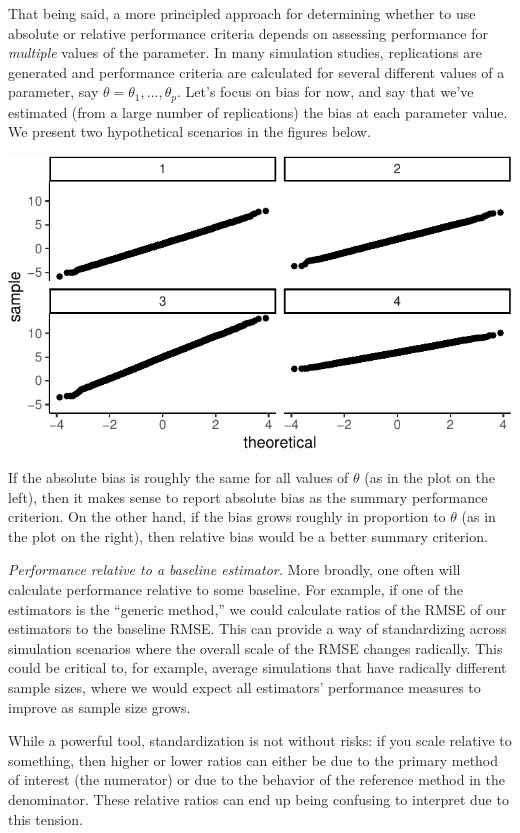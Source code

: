 \documentclass[
]{book}
\begin{document}
That being said, a more principled approach for determining whether to use absolute or relative performance criteria depends on assessing performance for \emph{multiple} values of the parameter.
In many simulation studies, replications are generated and performance criteria are calculated for several different values of a parameter, say \(\theta = \theta_1,...,\theta_p\).
Let's focus on bias for now, and say that we've estimated (from a large number of replications) the bias at each parameter value.
We present two hypothetical scenarios in the figures below.

\begin{center}\includegraphics[width=0.75\linewidth]{Designing-Simulations-in-R_files/figure-latex/unnamed-chunk-72-1} \end{center}

If the absolute bias is roughly the same for all values of \(\theta\) (as in the plot on the left), then it makes sense to report absolute bias as the summary performance criterion.
On the other hand, if the bias grows roughly in proportion to \(\theta\) (as in the plot on the right), then relative bias would be a better summary criterion.

\emph{Performance relative to a baseline estimator.}
More broadly, one often will calculate performance relative to some baseline.
For example, if one of the estimators is the ``generic method,'' we could calculate ratios of the RMSE of our estimators to the baseline RMSE.
This can provide a way of standardizing across simulation scenarios where the overall scale of the RMSE changes radically.
This could be critical to, for example, average simulations that have radically different sample sizes, where we would expect all estimators' performance measures to improve as sample size grows.

While a powerful tool, standardization is not without risks: if you scale relative to something, then higher or lower ratios can either be due to the primary method of interest (the numerator) or due to the behavior of the reference method in the denominator.
These relative ratios can end up being confusing to interpret due to this tension.
\end{document}
